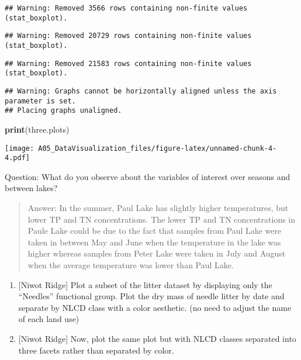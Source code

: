 \documentclass[]{article}
\newenvironment{Shaded}{\begin{snugshade}}{\end{snugshade}}
\newcommand{\KeywordTok}[1]{\textcolor[rgb]{0.13,0.29,0.53}{\textbf{#1}}}
\newcommand{\NormalTok}[1]{#1}
\begin{document}
\begin{verbatim}
## Warning: Removed 3566 rows containing non-finite values (stat_boxplot).
\end{verbatim}

\begin{verbatim}
## Warning: Removed 20729 rows containing non-finite values (stat_boxplot).
\end{verbatim}

\begin{verbatim}
## Warning: Removed 21583 rows containing non-finite values (stat_boxplot).
\end{verbatim}

\begin{verbatim}
## Warning: Graphs cannot be horizontally aligned unless the axis parameter is set.
## Placing graphs unaligned.
\end{verbatim}

\begin{Shaded}
\begin{Highlighting}[]
\KeywordTok{print}\NormalTok{(three.plots)}
\end{Highlighting}
\end{Shaded}

\texttt{[image: A05\_DataVisualization\_files/figure-latex/unnamed-chunk-4-4.pdf]}

Question: What do you observe about the variables of interest over
seasons and between lakes?

\begin{quote}
Answer: In the summer, Paul Lake has slightly higher temperatures, but
lower TP and TN concentrations. The lower TP and TN concentrations in
Paule Lake could be due to the fact that samples from Paul Lake were
taken in between May and June when the temperature in the lake was
higher whereas samples from Peter Lake were taken in July and August
when the average temperature was lower than Paul Lake.
\end{quote}

\begin{enumerate}
\def\labelenumi{\arabic{enumi}.}
\setcounter{enumi}{5}
\item
  {[}Niwot Ridge{]} Plot a subset of the litter dataset by displaying
  only the ``Needles'' functional group. Plot the dry mass of needle
  litter by date and separate by NLCD class with a color aesthetic. (no
  need to adjust the name of each land use)
\item
  {[}Niwot Ridge{]} Now, plot the same plot but with NLCD classes
  separated into three facets rather than separated by color.
\end{enumerate}
\end{document}
